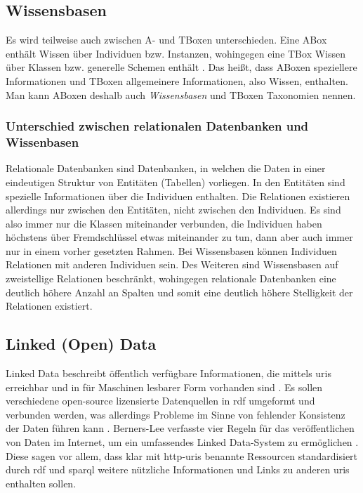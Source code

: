\subsection{Wissensbasen}
Es wird teilweise auch zwischen A- und TBoxen unterschieden.
Eine ABox enthält Wissen über Individuen bzw. Instanzen, wohingegen eine TBox Wissen über Klassen bzw. generelle Schemen enthält \citep[S.~167]{semanticwebgrundlagen}.
Das heißt, dass ABoxen speziellere Informationen und TBoxen allgemeinere Informationen, also Wissen, enthalten.
Man kann ABoxen deshalb auch \emph{Wissensbasen} und TBoxen Taxonomien nennen.

\subsubsection{Unterschied zwischen relationalen Datenbanken und Wissenbasen}
Relationale Datenbanken sind Datenbanken, in welchen die Daten in einer eindeutigen Struktur von Entitäten (Tabellen) vorliegen.
In den Entitäten sind spezielle Informationen über die Individuen enthalten.
Die Relationen existieren allerdings nur zwischen den Entitäten, nicht zwischen den Individuen.
Es sind also immer nur die Klassen miteinander verbunden, die Individuen haben höchstens über Fremdschlüssel etwas miteinander zu tun, dann aber auch immer nur in einem vorher gesetzten Rahmen.
Bei Wissensbasen können Individuen Relationen mit anderen Individuen sein.
Des Weiteren sind Wissensbasen auf zweistellige Relationen beschränkt,
wohingegen relationale Datenbanken eine deutlich höhere Anzahl an Spalten und somit eine deutlich höhere Stelligkeit der Relationen existiert.

\subsection{Linked (Open) Data}

Linked Data beschreibt öffentlich verfügbare Informationen, die mittels \acp{uri} erreichbar und in für Maschinen lesbarer Form vorhanden sind \citep{linkeddata}.
Es sollen verschiedene open-source lizensierte Datenquellen in \ac{rdf} umgeformt und verbunden werden, was allerdings Probleme im Sinne von fehlender Konsistenz der Daten führen kann \citep{semanticwebreview}.
Berners-Lee verfasste vier Regeln für das veröffentlichen von Daten im Internet, um ein umfassendes Linked Data-System zu ermöglichen \citep{linkeddatadesignissues}.
Diese sagen vor allem, dass klar mit \ac{http}-\acp{uri} benannte Ressourcen standardisiert durch \ac{rdf} und \ac{sparql} weitere nützliche Informationen und Links zu anderen \acp{uri} enthalten sollen.

